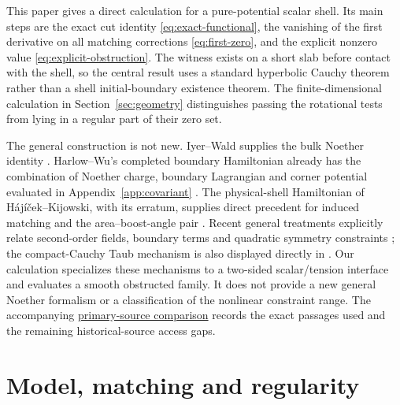 \documentclass[11pt]{article}
\theoremstyle{remark}
\begin{document}
This paper gives a direct calculation for a pure-potential scalar shell.
Its main steps are the exact cut identity \eqref{eq:exact-functional}, the
vanishing of the first derivative on all matching corrections
\eqref{eq:first-zero}, and the explicit nonzero value
\eqref{eq:explicit-obstruction}. The witness exists on a short slab before
contact with the shell, so the central result uses a standard hyperbolic
Cauchy theorem rather than a shell initial-boundary existence theorem.
The finite-dimensional calculation in Section~\ref{sec:geometry} distinguishes
passing the rotational tests from lying in a regular part of their zero set.

The general construction is not new. Iyer--Wald supplies the bulk Noether
identity \cite{IyerWald1994}. Harlow--Wu's completed boundary Hamiltonian
already has the combination of Noether charge, boundary Lagrangian and
corner potential evaluated in Appendix~\ref{app:covariant}
\cite{HarlowWu2020}. The physical-shell Hamiltonian of H\'aj\'i\v cek--Kijowski,
with its erratum, supplies direct precedent for induced matching and the
area--boost-angle pair \cite{HajicekKijowski1998,HajicekKijowski2000Erratum}.
Recent general treatments explicitly relate second-order fields, boundary
terms and quadratic symmetry constraints
\cite{DeVuystEtAl2025,Khavkine2015}; the compact-Cauchy Taub mechanism is also
displayed directly in \cite{AltasTekin2019}.
Our calculation specializes these mechanisms to a two-sided scalar/tension
interface and evaluates a smooth obstructed family. It does not provide a
new general Noether formalism or a classification of the nonlinear constraint
range. The accompanying \href{https://github.com/maldonado-research/HDblast/blob/main/research/HDBLAST_ROTATIONAL_OBSTRUCTION_PAPER_20261015/literature/PRIMARY_COMPARISON.md}{primary-source comparison}
records the exact passages used and the remaining historical-source access gaps.

\section{Model, matching and regularity}
\label{sec:model}
\end{document}
